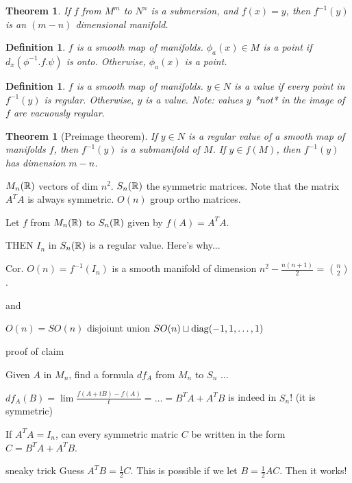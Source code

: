 \documentclass[11pt]{amsbook}
\theoremstyle{mystyle} %
\newtheorem{thrm}[thm]{Theorem}
\newtheorem{defi}[thm]{Definition}
\numberwithin{thm}{section}
\begin{document}
\begin{thrm}
	If $f$ from $M^m$ to $N^n$ is a submersion, and $f(x) = y$, then $f^{-1}(y)$ is an $(m-n)$ dimensional manifold.
\end{thrm}

\begin{defi}
	$f$ is a smooth map of manifolds.
	$\phi_a(x) \in M$ is a  point if $d_x(\phi^{-1}.f.\psi)$ is onto.  Otherwise, $\phi_a(x)$ is a  point.
\end{defi}

\begin{defi}
	$f$ is a smooth map of manifolds.
	$y \in N$ is a  value if every point in $f^{-1}(y)$ is regular.  Otherwise, $y$ is a  value.  Note: values $y$ *not* in the image of $f$ are vacuously regular.
\end{defi}

\begin{thrm}[Preimage theorem]
	If $y \in N$ is a regular value of a smooth map of manifolds $f$, then $f^{-1}(y)$ is a submanifold of $M$.  If $y \in f(M)$, then $f^{-1}(y)$ has dimension $m-n$.
\end{thrm}

\begin{example}
	$M_n({\mathbb R})$ vectors of dim $n^2$.  $S_n({\mathbb R})$ the symmetric matrices.  Note that the matrix $A^T A$ is always symmetric.  $O(n)$ group ortho matrices.

	Let $f$ from $M_n({\mathbb R})$ to $S_n({\mathbb R})$ given by $f(A) = A^T A$.

	THEN $I_n$ in $S_n({\mathbb R})$ is a regular value.  Here's why...

	Cor. $O(n) = f^{-1}(I_n)$ is a smooth manifold of dimension $n^2 - \frac{n(n+1)}{2}$ = $\binom n2$.

	and

	$O(n) = SO(n)$ disjoiunt union $SO(n) \sqcup
        \operatorname{diag}(-1, 1, \ldots,  1)$

	proof of claim

	Given $A$ in $M_n$, find a formula $df_A$ from $M_n$ to $S_n$ ...

	$df_A(B) = \lim \frac{f(A+tB) - f(A)}{t} = \ldots = B^T A + A^T B$
	is indeed in $S_n$! (it is symmetric)

	If $A^T A = I_n$, can every symmetric matric $C$ be written in the form $C = B^T A + A^T B$.

	sneaky trick
	Guess $A^T B = \frac12 C$.
	This is possible if we let $B = \frac12 AC$.
	Then it works!
\end{example}
\end{document}

